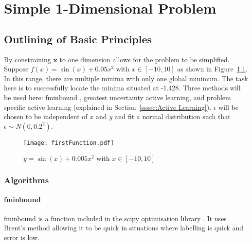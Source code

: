 
\chapter{Simple 1-Dimensional Problem}

\ifpdf
    \graphicspath{{Chapter2/Figs/Raster/}{Chapter2/Figs/PDF/}{Chapter2/Figs/}}
\else
    \graphicspath{{Chapter2/Figs/Vector/}{Chapter2/Figs/}}
\fi


\section{Outlining of Basic Principles}

By constraining $\bm{x}$ to one dimension allows for the problem to be simplified. Suppose ${f(x)=\sin(x)+0.05x^2}$ with ${x\in [-10, 10]}$ as shown in Figure~\ref{fig:firstFunction}. In this range, there are multiple minima with only one global minimum. The task here is to successfully locate the minima situated at -1.428. Three methods will be used here: $\text{fminbound}$ \cite{2020SciPy-NMeth}, greatest uncertainty active learning, and problem specific active learning (explained in Section~\ref{sssec:Active Learning}). $\epsilon$ will be chosen to be independent of $x$ and $y$ and fit a normal distribution such that ${\epsilon\sim N(0, 0.2^2)}$.

\begin{figure}[htbp!] 
\centering    
\texttt{[image: firstFunction.pdf]}
\caption[First Function]{$y = \sin(x) + 0.005x^2$ with $x\in [-10, 10]$}
\label{fig:firstFunction}
\end{figure}

\subsection{Algorithms}
\label{ssec: algorithms}
\subsubsection{fminbound}
fminbound is a function included in the scipy optimisation library \cite{2020SciPy-NMeth}. It uses Brent's method allowing it to be quick in situations where labelling is quick and error is low.

